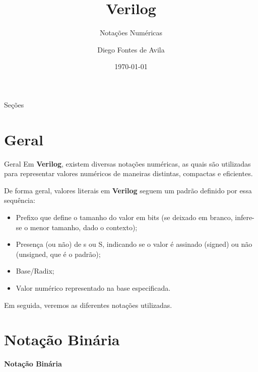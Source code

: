 \documentclass[aspectratio=169,xcolor=dvipsnames]{beamer}
\title{Verilog}
\subtitle{Notações Numéricas}
\author{Diego Fontes de Avila}
\institute
{
    Poliware \\
    Escola Politécnica da Universidade de São Paulo %
}
\date{\today} %
\begin{document}
\begin{frame}
    \titlepage
\end{frame}

\begin{frame}{Seções}
    \tableofcontents
\end{frame}

\section{Geral}

\begin{frame}{Geral}
    Em \textbf{Verilog}, existem diversas notações numéricas, as quais são utilizadas para representar valores numéricos de maneiras distintas, compactas e eficientes.

    De forma geral, valores literais em \textbf{Verilog} seguem um padrão definido por essa sequência:
    \begin{itemize}
        \item Prefixo que define o tamanho do valor em bits (se deixado em branco, infere-se o menor tamanho, dado o contexto);
        \item Presença (ou não) de s ou S, indicando se o valor é assinado (signed) ou não (unsigned, que é o padrão);
        \item Base/Radix;
        \item Valor numérico representado na base especificada.
    \end{itemize}

    Em seguida, veremos as diferentes notações utilizadas.
\end{frame}

\section{Notação Binária}
\begin{frame}
    \Huge{\centerline{\textbf{Notação Binária}}}
\end{frame}
\end{document}

